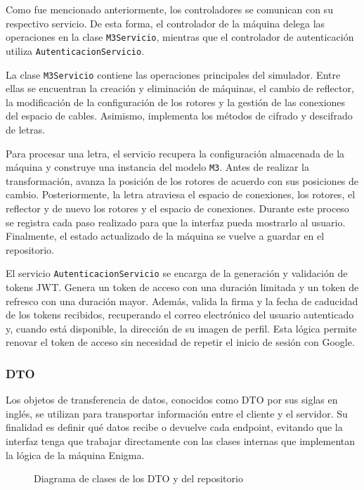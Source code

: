 Como fue mencionado anteriormente, los controladores se comunican con su respectivo servicio. De esta forma, el controlador de la máquina delega las operaciones en la clase \texttt{M3Servicio}, mientras que el controlador de autenticación utiliza \texttt{AutenticacionServicio}.

La clase \texttt{M3Servicio} contiene las operaciones principales del simulador. Entre ellas se encuentran la creación y eliminación de máquinas, el cambio de reflector, la modificación de la configuración de los rotores y la gestión de las conexiones del espacio de cables. Asimismo, implementa los métodos de cifrado y descifrado de letras.

Para procesar una letra, el servicio recupera la configuración almacenada de la máquina y construye una instancia del modelo \texttt{M3}. Antes de realizar la transformación, avanza la posición de los rotores de acuerdo con sus posiciones de cambio. Posteriormente, la letra atraviesa el espacio de conexiones, los rotores, el reflector y de nuevo los rotores y el espacio de conexiones. Durante este proceso se registra cada paso realizado para que la interfaz pueda mostrarlo al usuario. Finalmente, el estado actualizado de la máquina se vuelve a guardar en el repositorio.

El servicio \texttt{AutenticacionServicio} se encarga de la generación y validación de tokens JWT. Genera un token de acceso con una duración limitada y un token de refresco con una duración mayor. Además, valida la firma y la fecha de caducidad de los tokens recibidos, recuperando el correo electrónico del usuario autenticado y, cuando está disponible, la dirección de su imagen de perfil. Esta lógica permite renovar el token de acceso sin necesidad de repetir el inicio de sesión con Google. 

\subsubsection{DTO}

Los objetos de transferencia de datos, conocidos como DTO por sus siglas en inglés, se utilizan para transportar información entre el cliente y el servidor. Su finalidad es definir qué datos recibe o devuelve cada endpoint, evitando que la interfaz tenga que trabajar directamente con las clases internas que implementan la lógica de la máquina Enigma.

\begin{figure}[htbp]
	\centerline{}
	\caption{Diagrama de clases de los DTO y del repositorio}
	\label{clases_dto}
\end{figure}

